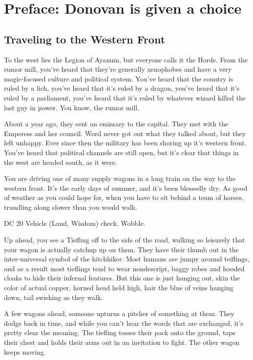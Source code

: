 \section{Preface: Donovan is given a choice}\label{sec:prefaceC:DonovanIsGivenAChoice}
\begin{multicols}{2}
\subsection{Traveling to the Western Front}
  \begin{aloud}
  To the west lies the Legion of Ayanum, but everyone calls it the Horde.
  From the rumor mill, you've heard that they're generally xenophobes and have a very magic-focused
    culture and political system.
  You've heard that the country is ruled by a lich, you've heard that it's ruled by a dragon,
  you've heard that it's ruled by a parliament, you've heard that it's ruled by whatever
    wizard killed the last guy in power.
  You know, the rumor mill.

  About a year ago, they sent an emissary to the capital.
  They met with the Emperess and her council.
  Word never got out what they talked about, but they left unhappy.
  Ever since then the military has been shoring up it's western front.
  You've heard that political channels are still open, but it's clear that things in the west are
    headed south, as it were.

  You are driving one of many supply wagons in a long train on the way to the western front.
  It's the early days of summer, and it's been blessedly dry.
  As good of weather as you could hope for, when you have to sit behind a team of horses,
    trundling along slower than you would walk.
  \end{aloud}

DC 20 Vehicle (Land, Wisdom) check.  Wobble.

  \begin{aloud}
  Up ahead, you see a Tiefling off to the side of the road,
    walking so leisurely that your wagon is actually catchup up on them.
  They have their thumb out in the inter-universal symbol of the hitchhiker.
  Most humans are jumpy around teiflings, and as a result most tieflings tend to wear nondescript,
    baggy robes and hooded cloaks to hide their infernal features.
  But this one is just hanging out, skin the color of actual copper, horned head held high,
    hair the blue of veins hanging down, tail swishing as they walk.

  A few wagons ahead, someone upturns a pitcher of something at them.
  They dodge back in time, and while you can't hear the words that are exchanged, it's pretty clear
    the meaning.
  The tiefling tosses their pack onto the ground, taps their chest and holds their arms out in
    an invitation to fight.
  The other wagon keeps moving.


\end{aloud}
\end{multicols}
